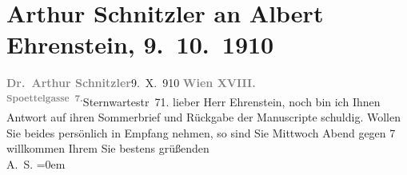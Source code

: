 

         
         \newcommand{\erwaehntePersonen}{Personen: Albert Ehrenstein}
         \newcommand{\erwaehnteInstitutionen}{}
         \newcommand{\erwaehnteOrte}{Orte: Edmund-Weiß-Gasse, Sternwartestraße, Wien, XVIII., Währing}
         \newcommand{\erwaehnteWerke}{Werke: Graf Cilli}
               \section[Arthur Schnitzler an Albert Ehrenstein, 9. 10. 1910]{ Arthur Schnitzler an Albert Ehrenstein, 9. 10. 1910}\nopagebreak{}\rehead{ }\begin{ledgroupsized}[t]{13cm}\normalsize\beginnumbering \toendnotes[C]{\smallbreak\pagebreak[2]} 
\toendnotes[C]{\smallbreak}\pstart
           {\pb}\textcolor{gray}{\textbf{Dr. Arthur Schnitzler}}\hfill 9. X. 910\pend
           \pstart
           \textcolor{gray}{\textbf{Wien XVIII.}}{ }\substVorne{}\textsuperscript{\textcolor{gray}{\textbf{Spoettelgasse 7.}}}{\allowbreak}\substDazwischen{}Sternwartestr 71.\substHinten{}\pend
           \pstart{}lieber Herr Ehrenstein,\pend\pstart
           noch bin ich Ihnen Antwort auf ihren Sommerbrief und Rückgabe der Manuscripte
               schuldig. Wollen Sie beides
                    persönlich in Empfang nehmen, so sind Sie Mittwoch Abend gegen 7
                    willkommen\pend
           \pstart
           Ihrem Sie bestens grüßenden{\\[\baselineskip]}\spacefill\mbox{A. S.}\pend
           \leftskip=0em{}
         
         \endnumbering{}\end{ledgroupsized}  \newcommand{\dateiname}{L01965}\newcommand{\titel}{Arthur Schnitzler an Albert Ehrenstein, 9. 10. 1910}\newcommand{\editorInnen}{Martin Anton Müller und Gerd-Hermann Susen}
      